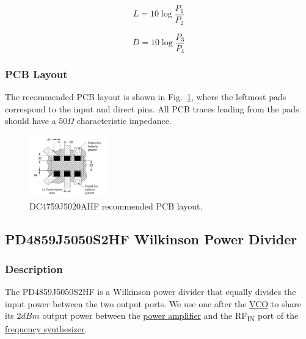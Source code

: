 \begin{equation}
        \label{eq:insertion-loss}
        L = 10 \log \frac{P_1}{P_2}
\end{equation}

\begin{equation}
        \label{eq:directivity}
        D = 10 \log \frac{P_3}{P_4}
\end{equation}

\subsubsection{PCB Layout}
\label{sec:dc4759j5020ahf-pcb}

The recommended PCB layout is shown in Fig.~\ref{fig:dc4759j5020ahf-pcb}, where the leftmost pads
correspond to the input and direct pins. All PCB traces leading from the pads should have a $50
\si{\Omega}$ characteristic impedance.

\begin{figure}[h]
        \centering
        \includegraphics[width=0.3\textwidth]{data/dc4759j5020ahf-pcb}
        \caption{DC4759J5020AHF recommended PCB layout.}
        \label{fig:dc4759j5020ahf-pcb}
\end{figure}

\subsection{PD4859J5050S2HF Wilkinson Power Divider}
\label{sec:pd4859j5050s2hf}

\subsubsection{Description}
\label{sec:pd4859j5050s2hf-description}

The PD4859J5050S2HF is a Wilkinson power divider that equally divides the input power between the
two output ports. We use one after the \hyperref[sec:hmc431lp4rf]{VCO} to share its $2 \si{dBm}$
output power between the \hyperref[sec:se2567l]{power amplifier} and the RF\textsubscript{IN} port
of the \hyperref[sec:adf4158]{frequency synthesizer}.

